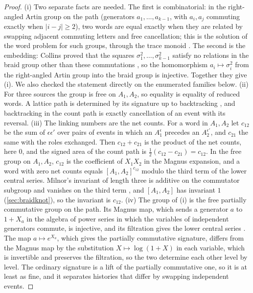 \documentclass[11pt]{article}
\theoremstyle{definition}\newtheorem{definition}[theorem]{Definition}\newtheorem{remark}[theorem]{Remark}\newtheorem{example}[theorem]{Example}\newtheorem{problem}[theorem]{Open problem}\crefname{problem}{Problem}{Problems}
\begin{document}
\begin{proof}
(i) Two separate facts are needed. The first is combinatorial: in the right-angled Artin group on the path (generators $a_1,\dots,a_{k-1}$, with $a_i,a_j$ commuting exactly when $|i-j|\ge2$), two words are equal exactly when they are related by swapping adjacent commuting letters and free cancellation; this is the solution of the word problem for such groups, through the trace monoid \cite{CartierFoata1969}. The second is the embedding: Collins proved that the squares $\sigma_1^2,\dots,\sigma_{k-1}^2$ satisfy no relations in the braid group other than these commutations \cite{Collins1994}, so the homomorphism $a_i\mapsto\sigma_i^2$ from the right-angled Artin group into the braid group is injective. Together they give (i). We also checked the statement directly on the enumerated families below. (ii) For three sources the group is free on $A_1,A_2$, so equality is equality of reduced words. A lattice path is determined by its signature up to backtracking \cite{HamblyLyons2010}, and backtracking in the count path is exactly cancellation of an event with its reversal. (iii) The linking numbers are the net counts. For a word in $A_1,A_2$ let $c_{12}$ be the sum of $\epsilon\epsilon'$ over pairs of events in which an $A_1^{\epsilon}$ precedes an $A_2^{\epsilon'}$, and $c_{21}$ the same with the roles exchanged. Then $c_{12}+c_{21}$ is the product of the net counts, here $0$, and the signed area of the count path is $\tfrac12(c_{12}-c_{21})=c_{12}$. In the free group on $A_1,A_2$, $c_{12}$ is the coefficient of $X_1X_2$ in the Magnus expansion, and a word with zero net counts equals $[A_1,A_2]^{c_{12}}$ modulo the third term of the lower central series. Milnor's invariant of length three is additive on the commutator subgroup and vanishes on the third term \cite{Milnor1954,HabeggerLin1990}, and $[A_1,A_2]$ has invariant $1$ (\cref{sec:braidknot}), so the invariant is $c_{12}$. (iv) The group of (i) is the free partially commutative group on the path. Its Magnus map, which sends a generator $a$ to $1+X_a$ in the algebra of power series in which the variables of independent generators commute, is injective, and its filtration gives the lower central series \cite{DuchampKrob1992}. The map $a\mapsto e^{X_a}$, which gives the partially commutative signature, differs from the Magnus map by the substitution $X\mapsto\log(1+X)$ in each variable, which is invertible and preserves the filtration, so the two determine each other level by level. The ordinary signature is a lift of the partially commutative one, so it is at least as fine, and it separates histories that differ by swapping independent events.
\end{proof}
\end{document}
